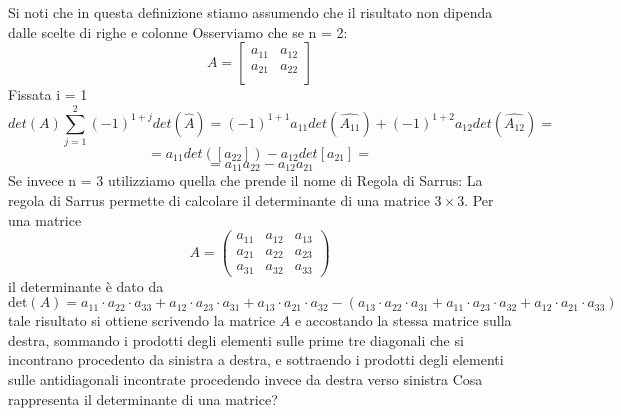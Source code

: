 \documentclass[a4paper, 12pt]{article}
\theoremstyle{definition}
\begin{document}
\medbreak
\noindent Si noti che in questa definizione stiamo assumendo che il risultato non dipenda dalle scelte di righe e colonne
\noindent Osserviamo che se n = 2:
\[
    A = \begin{bmatrix}
    a_{11} &  a_{12} \\
    a_{21} &  a_{22} \\
    \end{bmatrix}
\]
\noindent Fissata i = 1
\[ 
    det(A) \sum_{j = 1}^{2}(-1)^{1+j}det(\hat{A}) = (-1)^{1+1}a_{11}det(\hat{A_{11}}) + (-1)^{1+2}a_{12}det(\hat{A_{12}}) = 
\]
\[
    = a_{11}det([a_{22}]) - a_{12}det{[a_{21}]} = 
\]
\[
    = a_{11}a_{22} - a_{12}a_{21}
\]
\noindent Se invece n = 3 utilizziamo quella che prende il nome di Regola di Sarrus:
La regola di Sarrus permette di calcolare il determinante di una matrice \( 3 \times 3 \). Per una matrice
\[
A = \begin{pmatrix}
a_{11} & a_{12} & a_{13} \\
a_{21} & a_{22} & a_{23} \\
a_{31} & a_{32} & a_{33}
\end{pmatrix}
\]
il determinante è dato da
\[
\text{det}(A) = a_{11} \cdot a_{22} \cdot a_{33} + a_{12} \cdot a_{23} \cdot a_{31} + a_{13} \cdot a_{21} \cdot a_{32} - \left( a_{13} \cdot a_{22} \cdot a_{31} + a_{11} \cdot a_{23} \cdot a_{32} + a_{12} \cdot a_{21} \cdot a_{33} \right)
\]
\noindent tale risultato si ottiene scrivendo la matrice $A$ e accostando la stessa matrice sulla destra, sommando i prodotti degli elementi sulle prime tre diagonali che si incontrano procedento da sinistra a destra, e sottraendo i prodotti degli elementi sulle antidiagonali incontrate procedendo invece da destra verso sinistra
\newpage
Cosa rappresenta il determinante di una matrice?
\bigbreak
\end{document}
